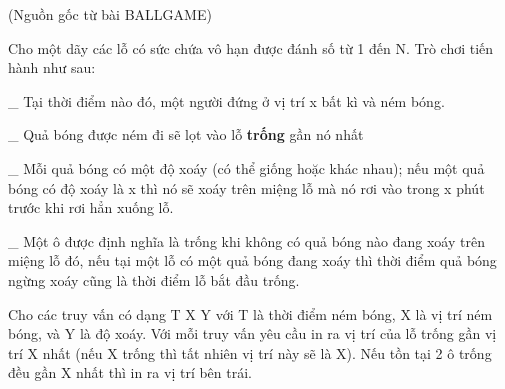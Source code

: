 (Nguồn gốc từ bài BALLGAME)  

   Cho một dãy các lỗ có sức chứa vô hạn được đánh số từ 1 đến N. Trò chơi tiến hành như sau:  

   \_ Tại thời điểm nào đó, một người đứng ở vị trí x bất kì và ném bóng.  

   \_ Quả bóng được ném đi sẽ lọt vào lỗ   \textbf{    trống   }   gần nó nhất  

   \_ Mỗi quả bóng có một độ xoáy (có thể giống hoặc khác nhau); nếu một quả bóng có độ xoáy là x thì nó sẽ xoáy trên miệng lỗ mà nó rơi vào trong x phút trước khi rơi hẳn xuống lỗ.  

   \_ Một ô được định nghĩa là trống khi không có quả bóng nào đang xoáy trên miệng lỗ đó, nếu tại một lỗ có một quả bóng đang xoáy thì thời điểm quả bóng ngừng xoáy cũng là thời điểm lỗ bắt đầu trống.  

   Cho các truy vấn có dạng T X Y với T là thời điểm ném bóng, X là vị trí ném bóng, và Y là độ xoáy. Với mỗi truy vấn yêu cầu in ra vị trí của lỗ trống gần vị trí X nhất (nếu X trống thì tất nhiên vị trí này sẽ là X). Nếu tồn tại 2 ô trống đều gần X nhất thì in ra vị trí bên trái.